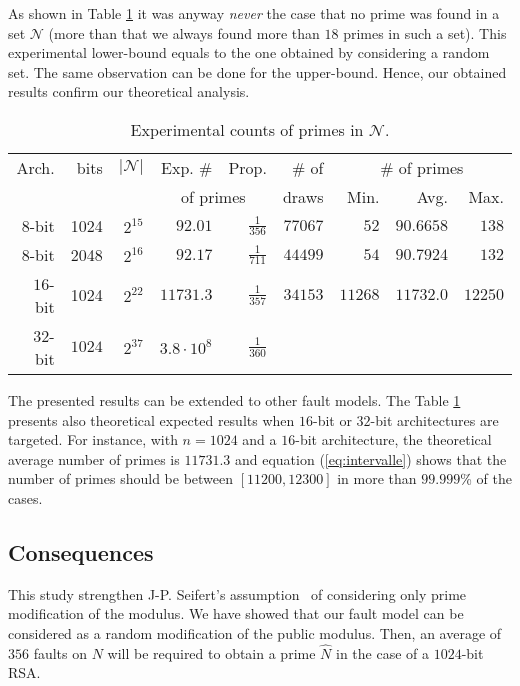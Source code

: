\documentclass{article}
\begin{document}
As shown in Table \ref{tab:ppcount} it was anyway \textit{never} the case
that no prime was found in a set ${\mathcal N}$ (more than that we
always found more than $18$ primes in such a set). This experimental lower-bound equals to the one obtained by considering a random set. The same observation can be done for the upper-bound.
Hence, our obtained results confirm our theoretical analysis.

\begin{table}[htb]\begin{center}
\begin{tabular}{|r|r|r|r|r||r|r|r|r|}
\hline
Arch. & bits & $|{\mathcal N}|$ & Exp. \# & Prop. & \#
of & \multicolumn{3}{|c|}{\# of primes} \\
      & & &\multicolumn{2}{|c||}{of primes}&draws & Min.  & Avg.  & Max. \\
\hline
$8$-bit & 1024 & $2^{15}$ & $92.01$ & $\frac{1}{356}$ & $77067$ & $52$ & $90.6658$ & $138$\\
$8$-bit & 2048 & $2^{16}$ & $92.17$ & $\frac{1}{711}$ & $44499$ & $54$ & $90.7924$ & $132$\\
$16$-bit & 1024 & $2^{22}$ & $11731.3$ & $\frac{1}{357}$ & $34153$ & $11268$ & $11732.0$ & $12250$\\
$32$-bit & $1024$ & $2^{37}$ & $3.8\cdot 10^8$ &$\frac{1}{360}$ & & &  & \\
\hline
\end{tabular}
\caption{Experimental counts of primes in ${\mathcal N}$.}\label{tab:ppcount}
\end{center}
\end{table}

The presented results can be extended to other fault models. The Table
\ref{tab:ppcount} presents also theoretical expected results when
$16$-bit or $32$-bit architectures are targeted.
For instance, with $n=1024$ and a $16$-bit architecture, the theoretical
average number of primes 
is $11731.3$ and equation (\ref{eq:intervalle}) shows that the number
of primes should be between $[11200,12300]$ in more than $99.999$\% of the 
cases.


\subsection{Consequences} This study strengthen J-P. Seifert's assumption~\cite{67,13} of considering only prime modification of the modulus. We have showed that our fault model can be considered as a random modification of the public modulus. Then, an average of $356$ faults on $N$ will be required to obtain a prime $\hat{N}$ in the case of a $1024$-bit RSA.
\end{document}

